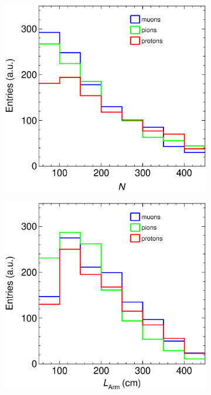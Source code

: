 \begin{figure}[t]
     \centering
     \begin{subfigure}[b]{0.32\textwidth}
         \centering
         \includegraphics[width=\textwidth]{figures/ch6-TKI/Properties/ALICEStRecoGAr_Nparticles.eps}
         \caption{}
         \label{fig:ALICEStRecoGAr_Nparticles}
     \end{subfigure}
     \begin{subfigure}[b]{0.32\textwidth}
         \centering
         \includegraphics[width=\textwidth]{figures/ch6-TKI/Properties/ALICEStRecoGAr_lArmMCparticles.eps}

\end{subfigure}
\end{figure}
